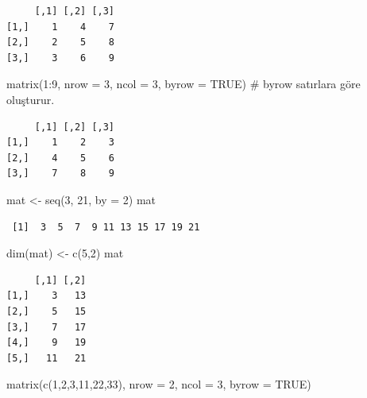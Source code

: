 \documentclass[
  letterpaper,
  DIV=11,
  numbers=noendperiod]{scrreprt}
\newenvironment{Shaded}{\begin{snugshade}}{\end{snugshade}}
\newcommand{\AttributeTok}[1]{\textcolor[rgb]{0.40,0.45,0.13}{#1}}
\newcommand{\CommentTok}[1]{\textcolor[rgb]{0.37,0.37,0.37}{#1}}
\newcommand{\ConstantTok}[1]{\textcolor[rgb]{0.56,0.35,0.01}{#1}}
\newcommand{\DecValTok}[1]{\textcolor[rgb]{0.68,0.00,0.00}{#1}}
\newcommand{\FunctionTok}[1]{\textcolor[rgb]{0.28,0.35,0.67}{#1}}
\newcommand{\NormalTok}[1]{\textcolor[rgb]{0.00,0.23,0.31}{#1}}
\newcommand{\OtherTok}[1]{\textcolor[rgb]{0.00,0.23,0.31}{#1}}
\newcommand{\SpecialCharTok}[1]{\textcolor[rgb]{0.37,0.37,0.37}{#1}}
\begin{document}
\begin{verbatim}
     [,1] [,2] [,3]
[1,]    1    4    7
[2,]    2    5    8
[3,]    3    6    9
\end{verbatim}

\begin{Shaded}
\begin{Highlighting}[]
\FunctionTok{matrix}\NormalTok{(}\DecValTok{1}\SpecialCharTok{:}\DecValTok{9}\NormalTok{, }\AttributeTok{nrow =} \DecValTok{3}\NormalTok{, }\AttributeTok{ncol =} \DecValTok{3}\NormalTok{, }\AttributeTok{byrow =} \ConstantTok{TRUE}\NormalTok{) }\CommentTok{\# byrow satırlara göre oluşturur.}
\end{Highlighting}
\end{Shaded}

\begin{verbatim}
     [,1] [,2] [,3]
[1,]    1    2    3
[2,]    4    5    6
[3,]    7    8    9
\end{verbatim}

\begin{Shaded}
\begin{Highlighting}[]
\NormalTok{mat }\OtherTok{\textless{}{-}} \FunctionTok{seq}\NormalTok{(}\DecValTok{3}\NormalTok{, }\DecValTok{21}\NormalTok{, }\AttributeTok{by =} \DecValTok{2}\NormalTok{)}
\NormalTok{mat}
\end{Highlighting}
\end{Shaded}

\begin{verbatim}
 [1]  3  5  7  9 11 13 15 17 19 21
\end{verbatim}

\begin{Shaded}
\begin{Highlighting}[]
\FunctionTok{dim}\NormalTok{(mat) }\OtherTok{\textless{}{-}} \FunctionTok{c}\NormalTok{(}\DecValTok{5}\NormalTok{,}\DecValTok{2}\NormalTok{)}
\NormalTok{mat}
\end{Highlighting}
\end{Shaded}

\begin{verbatim}
     [,1] [,2]
[1,]    3   13
[2,]    5   15
[3,]    7   17
[4,]    9   19
[5,]   11   21
\end{verbatim}

\begin{Shaded}
\begin{Highlighting}[]
\FunctionTok{matrix}\NormalTok{(}\FunctionTok{c}\NormalTok{(}\DecValTok{1}\NormalTok{,}\DecValTok{2}\NormalTok{,}\DecValTok{3}\NormalTok{,}\DecValTok{11}\NormalTok{,}\DecValTok{22}\NormalTok{,}\DecValTok{33}\NormalTok{), }\AttributeTok{nrow =} \DecValTok{2}\NormalTok{, }\AttributeTok{ncol =} \DecValTok{3}\NormalTok{, }\AttributeTok{byrow =} \ConstantTok{TRUE}\NormalTok{)}
\end{Highlighting}
\end{Shaded}
\end{document}

